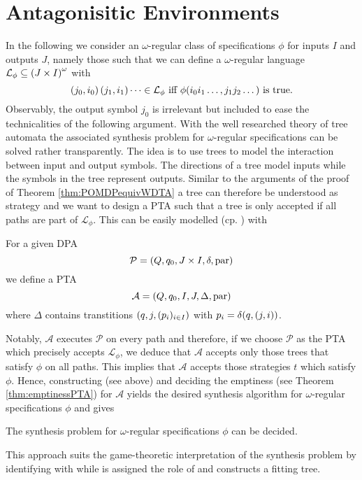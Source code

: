 \section{Antagonisitic Environments}
In the following we consider an $\omega$-regular class of specifications 
$\phi$ for inputs $I$ and outputs $J$, namely those such that we can define a 
$\omega$-regular language $\mathcal{L}_{\phi}\subseteq 
\left(J\times I\right)^{\omega}$ with
\begin{equation}
  \left(j_{0}, i_{0}\right)\left(j_{1}, i_{1}\right)\dots\in\mathcal{L}_{\phi}
  \text{ iff }
  \phi(i_{0}i_{1}\dots, j_{1}j_{2}\dots)\text{ is true.}
  \label{eq:omegaregularphi}
\end{equation}
Observably, the output symbol $j_{0}$ is irrelevant but included to ease the 
technicalities of the following argument. With the well researched theory of
tree automata the associated synthesis problem for $\omega$-regular 
specifications can be solved rather transparently. The idea is to use trees to 
model the interaction between input and output symbols. The directions of a 
tree model inputs while the symbols in the tree represent outputs. Similar to 
the arguments of the proof of Theorem \ref{thm:POMDPequivWDTA} a tree can 
therefore be understood as strategy and we want to design a \ac{PTA} such that 
a tree is only accepted if all paths are part of $\mathcal{L}_{\phi}$. This can 
be easily modelled (cp. \cite[Lemma 15]{AutoInfObj}) with
\begin{definition}
  For a given \ac{DPA}
  \begin{equation*}
    \mathcal{P} = \left(Q, q_{0}, J\times I, \delta, \operatorname{par}\right)
  \end{equation*}
  we define a \ac{PTA}
  \begin{equation*}
    \mathcal{A} = \left(Q, q_{0}, I, J, \Delta, \operatorname{par}\right)
  \end{equation*}
  where $\Delta$ contains transtitions $\left(q, j, (p_{i})_{i\in I}\right)$ with
  $p_{i} = \delta(q, \left(j, i\right))$.
\end{definition}
Notably, $\mathcal{A}$ executes $\mathcal{P}$ on every path and therefore, if 
we choose $\mathcal{P}$ as the \ac{PTA} which precisely accepts 
$\mathcal{L}_{\phi}$, we deduce that $\mathcal{A}$ accepts only those trees 
that satisfy $\phi$ on all paths. This implies that $\mathcal{A}$ accepts those
strategies $t$ which satisfy $\phi$. Hence, constructing (see above) and 
deciding the emptiness (see Theorem \ref{thm:emptinessPTA}) for $\mathcal{A}$ 
yields the desired synthesis algorithm for $\omega$-regular specifications 
$\phi$ and gives
\begin{theorem}
  \cite[Theorem 21, Theorem 22]{AutoInfObj}
  The synthesis problem for $\omega$-regular specifications $\phi$ can be 
  decided.
\end{theorem}
This approach suits the game-theoretic interpretation of the synthesis problem
by identifying  with \pathfinder{} while \outputp{} is assigned the 
role of \automaton{} and constructs a fitting tree.

